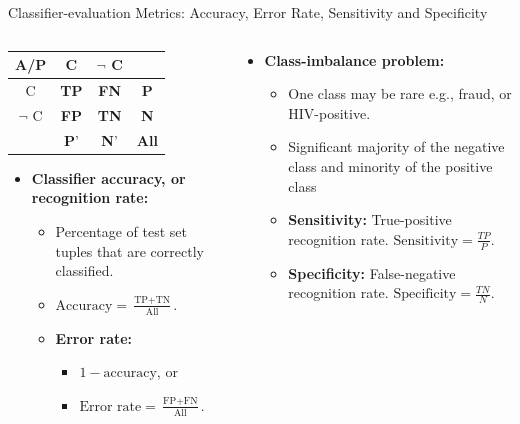 \begin{frame}{Classifier-evaluation Metrics: Accuracy, Error Rate, Sensitivity and Specificity}
	\begin{columns}
		\begin{column}{0.5\textwidth}
			\centering
			\begin{tabular}{|c|c|c|c|}
				\hline
				A/P      & C           & $\neg$ C    &              \\\hline
				C        & \textbf{TP} & \textbf{FN} & \textbf{P}   \\\hline
				$\neg$ C & \textbf{FP} & \textbf{TN} & \textbf{N}   \\\hline
				         & \textbf{P}' & \textbf{N}' & \textbf{All} \\\hline
			\end{tabular}
			\begin{itemize}
				\item \textbf{Classifier accuracy, or recognition rate:}
				      \begin{itemize}
					      \item Percentage of test set tuples that are correctly classified.
					      \item $\text{Accuracy} = \frac{\text{TP} + \text{TN}}{\text{All}}.$
					      \item \textbf{Error rate:}
					            \begin{itemize}
						            \item $1-\text{accuracy}$, or
						            \item $\text{Error rate} = \frac{\text{FP}+\text{FN}}{\text{All}}.$
					            \end{itemize}
				      \end{itemize}
			\end{itemize}
		\end{column}
		\begin{column}{0.5\textwidth}
			\begin{itemize}
				\item \textbf{Class-imbalance problem:}
				      \begin{itemize}
					      \item One class may be rare e.g., fraud, or HIV-positive.
					      \item Significant majority of the negative class and minority of the positive class
					      \item \textbf{Sensitivity:} True-positive recognition rate. $\text{Sensitivity} = \frac{TP}{P}$.
					      \item \textbf{Specificity:} False-negative recognition rate. $\text{Specificity} = \frac{TN}{N}$.
				      \end{itemize}
			\end{itemize}
		\end{column}
	\end{columns}
\end{frame}


